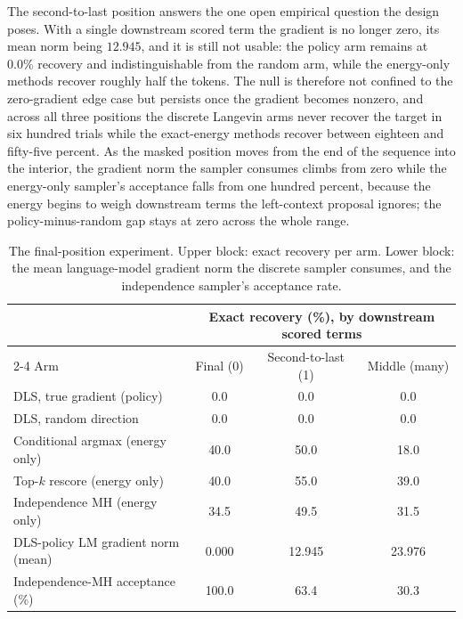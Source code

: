 The second-to-last position answers the one open empirical question the design poses. With a single downstream scored term the gradient is no longer zero, its mean norm being $12.945$, and it is still not usable: the policy arm remains at $0.0\%$ recovery and indistinguishable from the random arm, while the energy-only methods recover roughly half the tokens. The null is therefore not confined to the zero-gradient edge case but persists once the gradient becomes nonzero, and across all three positions the discrete Langevin arms never recover the target in six hundred trials while the exact-energy methods recover between eighteen and fifty-five percent. As the masked position moves from the end of the sequence into the interior, the gradient norm the sampler consumes climbs from zero while the energy-only sampler's acceptance falls from one hundred percent, because the energy begins to weigh downstream terms the left-context proposal ignores; the policy-minus-random gap stays at zero across the whole range.

\begin{table}[htbp]
    \centering
    \small
    \setlength{\tabcolsep}{4pt}
    \begin{tabular}{lccc}
        \toprule
        & \multicolumn{3}{c}{Exact recovery (\%), by downstream scored terms} \\
        \cmidrule(lr){2-4}
        Arm & Final (0) & Second-to-last (1) & Middle (many) \\
        \midrule
        DLS, true gradient (policy) & 0.0 & 0.0 & 0.0 \\
        DLS, random direction & 0.0 & 0.0 & 0.0 \\
        Conditional argmax (energy only) & 40.0 & 50.0 & 18.0 \\
        Top-$k$ rescore (energy only) & 40.0 & 55.0 & 39.0 \\
        Independence MH (energy only) & 34.5 & 49.5 & 31.5 \\
        \midrule
        DLS-policy LM gradient norm (mean) & 0.000 & 12.945 & 23.976 \\
        Independence-MH acceptance (\%) & 100.0 & 63.4 & 30.3 \\
        \bottomrule
    \end{tabular}
    \caption[Recovery by number of downstream scored terms, $n=200$ per condition.]{The final-position experiment. Upper block: exact recovery per arm. Lower block: the mean language-model gradient norm the discrete sampler consumes, and the independence sampler's acceptance rate.}
    \label{tab:lasttoken}
\end{table}

